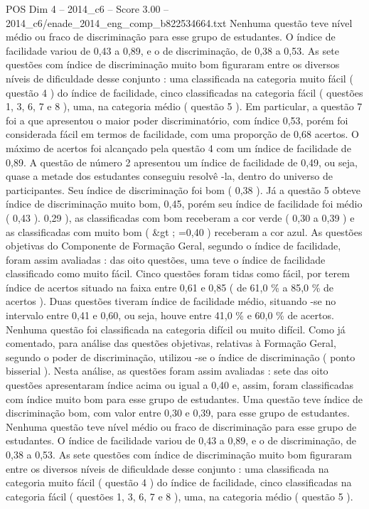 \begin{textsample}{POS Dim 4 – 2014\_c6 – Score 3.00 – 2014\_c6/enade\_2014\_eng\_comp\_b822534664.txt}
Nenhuma questão teve nível médio ou fraco de discriminação para esse grupo de estudantes.
O índice de facilidade variou de 0,43 a 0,89, e o de discriminação, de 0,38 a 0,53.
As sete questões com índice de discriminação muito bom figuraram entre os diversos níveis de dificuldade desse conjunto : uma classificada na categoria muito fácil ( questão 4 ) do índice de facilidade, cinco classificadas na categoria fácil ( questões 1, 3, 6, 7 e 8 ), uma, na categoria médio ( questão 5 ).
Em particular, a questão 7 foi a que apresentou o maior poder discriminatório, com índice 0,53, porém foi considerada fácil em termos de facilidade, com uma proporção de 0,68 acertos.
O máximo de acertos foi alcançado pela questão 4 com um índice de facilidade de 0,89.
A questão de número 2 apresentou um índice de facilidade de 0,49, ou seja, quase a metade dos estudantes conseguiu resolvê -la, dentro do universo de participantes.
Seu índice de discriminação foi bom ( 0,38 ).
Já a questão 5 obteve índice de discriminação muito bom, 0,45, porém seu índice de facilidade foi médio ( 0,43 ). 0,29 ), as classificadas com bom receberam a cor verde ( 0,30 a 0,39 ) e as classificadas com muito bom ( \&gt ; =0,40 ) receberam a cor azul.
As questões objetivas do Componente de Formação Geral, segundo o índice de facilidade, foram assim avaliadas : das oito questões, uma teve o índice de facilidade classificado como muito fácil.
Cinco questões foram tidas como fácil, por terem índice de acertos situado na faixa entre 0,61 e 0,85 ( de 61,0 \% a 85,0 \% de acertos ).
Duas questões tiveram índice de facilidade médio, situando -se no intervalo entre 0,41 e 0,60, ou seja, houve entre 41,0 \% e 60,0 \% de acertos.
Nenhuma questão foi classificada na categoria difícil ou muito difícil.
Como já comentado, para análise das questões objetivas, relativas à Formação Geral, segundo o poder de discriminação, utilizou -se o índice de discriminação ( ponto bisserial ).
Nesta análise, as questões foram assim avaliadas : sete das oito questões apresentaram índice acima ou igual a 0,40 e, assim, foram classificadas com índice muito bom para esse grupo de estudantes.
Uma questão teve índice de discriminação bom, com valor entre 0,30 e 0,39, para esse grupo de estudantes.
Nenhuma questão teve nível médio ou fraco de discriminação para esse grupo de estudantes.
O índice de facilidade variou de 0,43 a 0,89, e o de discriminação, de 0,38 a 0,53.
As sete questões com índice de discriminação muito bom figuraram entre os diversos níveis de dificuldade desse conjunto : uma classificada na categoria muito fácil ( questão 4 ) do índice de facilidade, cinco classificadas na categoria fácil ( questões 1, 3, 6, 7 e 8 ), uma, na categoria médio ( questão 5 ).

\end{textsample}
